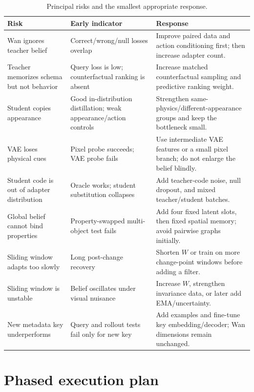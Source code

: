 \documentclass[11pt]{article}
\begin{document}
\begin{table}[H]
\centering
\small
\caption{Principal risks and the smallest appropriate response.}
\begin{tabularx}{\textwidth}{L{0.24\textwidth} Y Y}
\toprule
Risk & Early indicator & Response \\
\midrule
Wan ignores teacher belief & Correct/wrong/null losses overlap & Improve paired data and action conditioning first; then increase adapter count. \\
Teacher memorizes schema but not behavior & Query loss is low; counterfactual ranking is absent & Increase matched counterfactual sampling and predictive ranking weight. \\
Student copies appearance & Good in-distribution distillation; weak appearance/action controls & Strengthen same-physics/different-appearance groups and keep the bottleneck small. \\
VAE loses physical cues & Pixel probe succeeds; VAE probe fails & Use intermediate VAE features or a small pixel branch; do not enlarge the belief blindly. \\
Student code is out of adapter distribution & Oracle works; student substitution collapses & Add teacher-code noise, null dropout, and mixed teacher/student batches. \\
Global belief cannot bind properties & Property-swapped multi-object test fails & Add four fixed latent slots, then fixed spatial memory; avoid pairwise graphs initially. \\
Sliding window adapts too slowly & Long post-change recovery & Shorten $W$ or train on more change-point windows before adding a filter. \\
Sliding window is unstable & Belief oscillates under visual nuisance & Increase $W$, strengthen invariance data, or later add EMA/uncertainty. \\
New metadata key underperforms & Query and rollout tests fail only for new key & Add examples and fine-tune key embedding/decoder; Wan dimensions remain unchanged. \\
\bottomrule
\end{tabularx}
\end{table}

\section{Phased execution plan}
\end{document}
